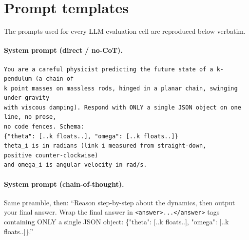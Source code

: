\documentclass{article}
\begin{document}
%
%

\small



\appendix
\section{Prompt templates}
The prompts used for every LLM evaluation cell are reproduced below verbatim.

\paragraph{System prompt (direct / no-CoT).}
\begin{small}\begin{verbatim}
You are a careful physicist predicting the future state of a k-pendulum (a chain of
k point masses on massless rods, hinged in a planar chain, swinging under gravity
with viscous damping). Respond with ONLY a single JSON object on one line, no prose,
no code fences. Schema:
{"theta": [..k floats..], "omega": [..k floats..]}
theta_i is in radians (link i measured from straight-down,
positive counter-clockwise)
and omega_i is angular velocity in rad/s.
\end{verbatim}\end{small}

\paragraph{System prompt (chain-of-thought).} Same preamble, then: ``Reason step-by-step
about the dynamics, then output your final answer. Wrap the final answer in
\texttt{<answer>...</answer>} tags containing ONLY a single JSON object:
\{"theta": [..k floats..], "omega": [..k floats..]\}.''
\end{document}
